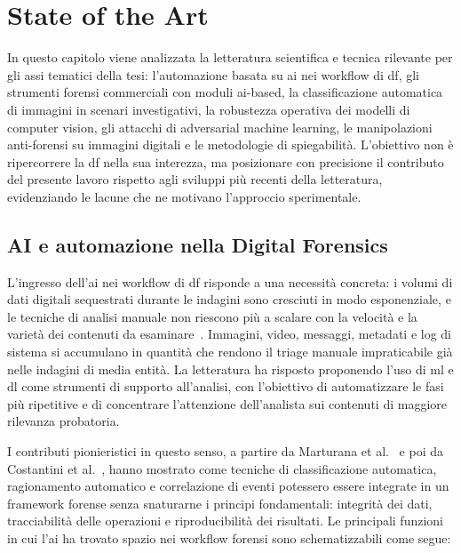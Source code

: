 
\chapter{State of the Art}\label{chap:state-of-the-art}

In questo capitolo viene analizzata la letteratura scientifica e tecnica rilevante per gli assi tematici della tesi: l'automazione basata su \gls{ai} nei workflow di \gls{df}, gli strumenti forensi commerciali con moduli \gls{ai}-based, la classificazione automatica di immagini in scenari investigativi, la robustezza operativa dei modelli di computer vision, gli attacchi di adversarial machine learning, le manipolazioni anti-forensi su immagini digitali e le metodologie di spiegabilità. L'obiettivo non è ripercorrere la \gls{df} nella sua interezza, ma posizionare con precisione il contributo del presente lavoro rispetto agli sviluppi più recenti della letteratura, evidenziando le lacune che ne motivano l'approccio sperimentale.


\section{AI e automazione nella Digital Forensics}
\label{sec:ai-df}

L'ingresso dell'\gls{ai} nei workflow di \gls{df} risponde a una necessità concreta: i volumi di dati digitali sequestrati durante le indagini sono cresciuti in modo esponenziale, e le tecniche di analisi manuale non riescono più a scalare con la velocità e la varietà dei contenuti da esaminare~\cite{garfinkel2010digital, costantini2019digital}. Immagini, video, messaggi, metadati e log di sistema si accumulano in quantità che rendono il triage manuale impraticabile già nelle indagini di media entità. La letteratura ha risposto proponendo l'uso di \gls{ml} e \gls{dl} come strumenti di supporto all'analisi, con l'obiettivo di automatizzare le fasi più ripetitive e di concentrare l'attenzione dell'analista sui contenuti di maggiore rilevanza probatoria.

I contributi pionieristici in questo senso, a partire da Marturana et al.~\cite{marturana2011digital} e poi da Costantini et al.~\cite{costantini2019digital}, hanno mostrato come tecniche di classificazione automatica, ragionamento automatico e correlazione di eventi potessero essere integrate in un framework forense senza snaturarne i principi fondamentali: integrità dei dati, tracciabilità delle operazioni e riproducibilità dei risultati. Le principali funzioni in cui l'\gls{ai} ha trovato spazio nei workflow forensi sono schematizzabili come segue:


